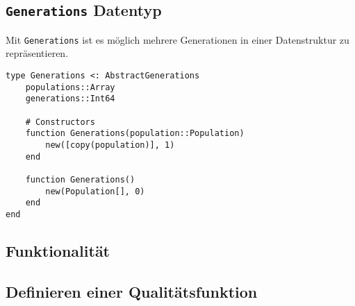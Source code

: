 \subsection{\texttt{Generations} Datentyp}
Mit \texttt{Generations} ist es möglich mehrere Generationen in einer Datenstruktur zu repräsentieren. 
\begin{Verbatim}
type Generations <: AbstractGenerations
    populations::Array
    generations::Int64

    # Constructors
    function Generations(population::Population)
        new([copy(population)], 1)
    end

    function Generations()
        new(Population[], 0)
    end
end
\end{Verbatim}

\subsection{Funktionalität}
\subsection{Definieren einer Qualitätsfunktion}
